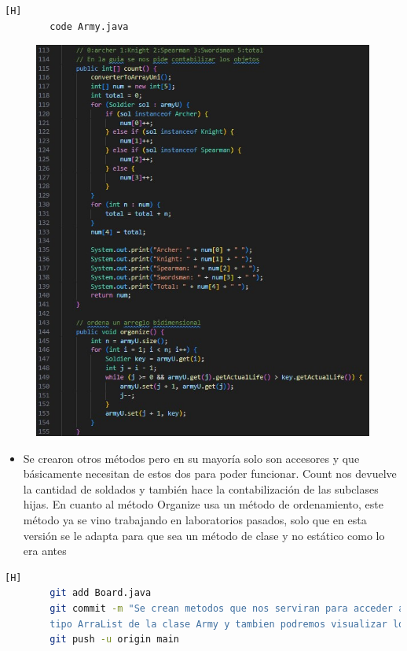 \documentclass{article}
\begin{document}
	\begin{lstlisting}[language=bash,caption={Se termina de crear los demás métodos}][H]
		code Army.java
	\end{lstlisting}
	\begin{figure}[H]
		\centering
		\includegraphics[width=1\textwidth,keepaspectratio]{img/otherArmy.jpg}
	\end{figure}
	\begin{itemize}	
		\item Se crearon otros métodos pero en su mayoría solo son accesores y que básicamente necesitan de estos dos para poder funcionar. Count nos devuelve la cantidad de soldados y también hace la contabilización de las subclases hijas. En cuanto al método Organize usa un método de ordenamiento, este método ya se vino trabajando en laboratorios pasados, solo que en esta versión se le adapta para que sea un método de clase y no estático como lo era antes  
	\end{itemize}	
	\begin{lstlisting}[language=bash,caption={Commit: 0f87b3ab9106b3b59a30c056e21495671d0e5fa2 }][H]
		git add Board.java
		git commit -m "Se crean metodos que nos serviran para acceder al atributo que es de
		tipo ArraList de la clase Army y tambien podremos visualizar los soldier de cada ejercito"			
		git push -u origin main
	\end{lstlisting}
	
\end{document}
